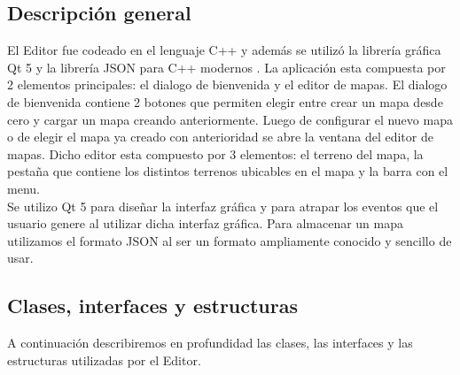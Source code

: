 \documentclass[titlepage,a4paper,12pt]{article}
\begin{document}
\subsection{Descripción general}

El Editor fue codeado en el lenguaje C++ y además se utilizó la librería gráfica Qt 5 y la librería JSON para C++ modernos . La aplicación esta compuesta por 2 elementos principales: el dialogo de bienvenida y el editor de mapas. El dialogo de bienvenida contiene 2 botones que permiten elegir entre crear un mapa desde cero y cargar un mapa creando anteriormente. Luego de configurar el nuevo mapa o de elegir el mapa ya creado con anterioridad se abre la ventana del editor de mapas. Dicho editor esta compuesto por 3 elementos: el terreno del mapa, la pestaña que contiene los distintos terrenos ubicables en el mapa y la barra con el menu.\\

Se utilizo Qt 5 para diseñar la interfaz gráfica y para atrapar los eventos que el usuario genere al utilizar dicha interfaz gráfica. Para almacenar un mapa utilizamos el formato JSON al ser un formato ampliamente conocido y sencillo de usar.

\subsection{Clases, interfaces y estructuras}

A continuación describiremos en profundidad las clases, las interfaces y las estructuras utilizadas por el Editor.
\end{document}
